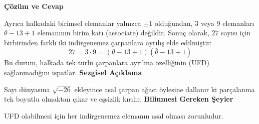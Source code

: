 \documentclass[11pt, a4paper]{article}
\newenvironment{cozum}{
    \vspace{0.5cm}
    \noindent\textcolor{green!60!black}{\faCheckCircle\enspace \textbf{\Large Çözüm ve Cevap}}\par\vspace{0.2cm}
}{}
\newenvironment{sezgisel}{
    \vspace{0.5cm}
    \noindent\textcolor{orange!80!black}{\faLightbulb\enspace \textbf{\Large Sezgisel Açıklama}}\par\vspace{0.2cm}
    \itshape
}{}
\newenvironment{bilgi}{
    \vspace{0.5cm}
    \noindent\textcolor{red!70!black}{\faExclamationTriangle\enspace \textbf{\Large Bilinmesi Gereken Şeyler}}\par\vspace{0.2cm}
}{}
\begin{document}
\begin{cozum}
Ayrıca halkadaki birimsel elemanlar yalnızca $\pm 1$ olduğundan, $3$ veya $9$ elemanları $\theta - 13 + 1$ elemanının birim katı (associate) değildir. Sonuç olarak, $27$ sayısı için birbirinden farklı iki indirgenemez çarpanlara ayrılış elde edilmiştir:
\[ 27 = 3 \cdot 9 = (\theta - 13 + 1)(\bar{\theta} - 13 + 1) \]
Bu durum, halkada tek türlü çarpanlara ayrılma özelliğinin (UFD) sağlanmadığını ispatlar.
\end{cozum}
\begin{sezgisel}
Sayı dünyasına $\sqrt{-26}$ ekleyince asal çarpan ağacı öylesine dallanır ki parçalanma tek boyutlu olmaktan çıkar ve eşsizlik kırılır.
\end{sezgisel}
\begin{bilgi}
UFD olabilmesi için her indirgenemez elemanın asal olması zorunludur.
\end{bilgi}

\newpage
\end{document}
